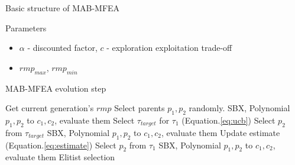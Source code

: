 \begin{frame}{Basic structure of MAB-MFEA}
    \fontsize{6pt}{7.2}\selectfont
    \begin{block}{Parameters}
        \begin{itemize}
            \item $\alpha$ - discounted factor, $c$ - exploration exploitation trade-off
            \item $rmp_{max}$, $rmp_{min}$
        \end{itemize}
    \end{block}

    \begin{block}{MAB-MFEA evolution step}
        \begin{algorithm}[H]
            \fontsize{6pt}{7.2}\selectfont
            \caption{\fontsize{6pt}{7.2}\selectfont Multi-step SR}\label{euclid}
            \begin{algorithmic}[1]
                \State Get current generation's $rmp$
                    \State Select parents $p_1, p_2$ randomly.
                        \State SBX, Polynomial $p_1, p_2$ to $c_1, c_2$, evaluate them
                        \State Select $\tau_{target}$ for $\tau_1$ (Equation.\ref{eq:ucb})
                        \State Select $p_2$ from $\tau_{target}$
                        \State SBX, Polynomial $p_1, p_2$ to $c_1, c_2$, evaluate them
                        \State Update estimate (Equation.\ref{eq:estimate})
                    \Else
                        \State Select $p_2$ from $\tau_1$
                        \State SBX, Polynomial $p_1, p_2$ to $c_1, c_2$, evaluate them
                    \EndIf
                \EndFor
                \State Elitist selection
            \end{algorithmic}
        \end{algorithm}
    \end{block}
\end{frame}
